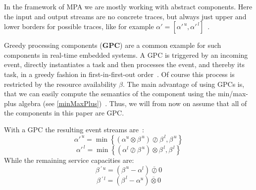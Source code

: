 In the framework of MPA we are mostly working with abstract components.
Here the input and output streams are no concrete traces, but always just upper and lower borders for possible traces, like for example \(\alpha' = [\alpha'^{\, u}, \alpha'^{\, l}]\)~\cite{wan:06}.

Greedy processing components (\textbf{GPC}) are a common example for such components in real-time embedded systems.
A GPC is triggered by an incoming event, directly instantiates a task and then processes the event, and thereby its task, in a greedy fashion
in first-in-first-out order~\cite{cho:08}.
Of course this process is restricted by the resource availability \(\beta\).
The main advantage of using GPCs is, that we can easily compute the semantics of the component using the min/max-plus algebra (see \autoref{minMaxPlus})~\cite{wan:06}.
Thus, we will from now on assume that all of the components in this paper are GPC.

With a GPC the resulting event streams are~\cite{wan:06}:
\[\alpha'^{\, u} = \min \left\{ (\alpha^{u} \otimes \beta ^{\, u}) \oslash \beta^{\, l}, \beta^{\, u} \right\} \]
\[\alpha'^{\, l} = \min \left\{ (\alpha^{l} \oslash \beta ^{\, u}) \otimes \beta^{\, l}, \beta^{\, l} \right\} \]
While the remaining service capacities are:
\[\beta \, ^{\prime\, u} = (\beta ^{\, u} - \alpha ^{l}) \overline{\oslash} 0 \]
\[\beta \, ^{\prime\, l} = (\beta ^{\, l} - \alpha ^{u}) \overline{\otimes} 0 \]